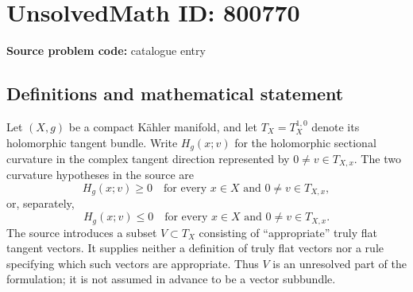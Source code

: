 \documentclass[11pt]{article}
\begin{document}
\section*{UnsolvedMath ID: 800770}
\textbf{Source problem code:} catalogue entry
\subsection{Definitions and mathematical statement}
Let \((X,g)\) be a compact K\"ahler manifold, and let \(T_X=T_X^{1,0}\) denote its holomorphic tangent bundle. Write \(H_g(x;v)\) for the holomorphic sectional curvature in the complex tangent direction represented by \(0\ne v\in T_{X,x}\). The two curvature hypotheses in the source are
\[
H_g(x;v)\geq 0\quad\text{for every }x\in X\text{ and }0\ne v\in T_{X,x},
\]
or, separately,
\[
H_g(x;v)\leq 0\quad\text{for every }x\in X\text{ and }0\ne v\in T_{X,x}.
\]
The source introduces a subset \(V\subset T_X\) consisting of ``appropriate'' truly flat tangent vectors. It supplies neither a definition of truly flat vectors nor a rule specifying which such vectors are appropriate. Thus \(V\) is an unresolved part of the formulation; it is not assumed in advance to be a vector subbundle.
\end{document}
